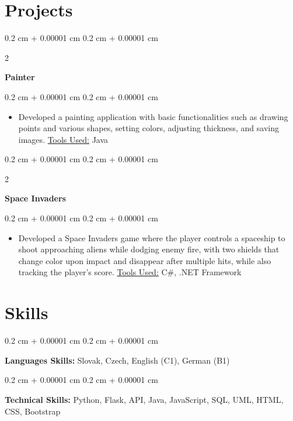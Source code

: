 \documentclass[10pt, letterpaper]{extarticle}
\newenvironment{highlights}{
    \begin{itemize}[
        topsep=0.10 cm,
        parsep=0.10 cm,
        partopsep=0pt,
        itemsep=0pt,
        leftmargin=0.4 cm + 10pt
    ]
}{
    \end{itemize}
} %
\newenvironment{onecolentry}{
    \begin{adjustwidth}{
        0.2 cm + 0.00001 cm
    }{
        0.2 cm + 0.00001 cm
    }
}{
    \end{adjustwidth}
} %
\newenvironment{twocolentry}[2][]{
    \onecolentry
    \def\secondColumn{#2}
    \setcolumnwidth{\fill, 4.5 cm}
    \begin{paracol}{2}
}{
    \switchcolumn \raggedleft \secondColumn
    \end{paracol}
    \endonecolentry
} %
\let\hrefWithoutArrow\href
\renewcommand{\href}[2]{\hrefWithoutArrow{#1}{\ifthenelse{\equal{#2}{}}{ }{#2 }\raisebox{.15ex}{\footnotesize \faExternalLink*}}}
\begin{document}
    \section{Projects}

        \begin{twocolentry}{
        \textit{\href{https://github.com/sabinasagova/painter}{\footnotesize\faGithub}}}
            \textbf{Painter}
        \end{twocolentry}

        \vspace{0.10 cm}
        \begin{onecolentry}
            \begin{highlights}
                \item Developed a painting application with basic functionalities such as drawing points and various shapes, setting colors, adjusting thickness, and saving images. \underline{Tools Used:} Java
            \end{highlights}
        \end{onecolentry}

        \vspace{0.2 cm}
        \begin{twocolentry}{
        \textit{\href{https://github.com/sabinasagova/space-invaders}{\footnotesize\faGithub}}}
            \textbf{Space Invaders}
        \end{twocolentry}

        \vspace{0.10 cm}
        \begin{onecolentry}
            \begin{highlights}
                 \item Developed a Space Invaders game where the player controls a spaceship to shoot approaching aliens while dodging enemy fire, with two shields that change color upon impact and disappear after multiple hits, while also tracking the player's score. \underline{Tools Used:} C\#, .NET Framework
            \end{highlights}
        \end{onecolentry}

    \section{Skills}

          
    \begin{onecolentry}
        \textbf{Languages Skills:} Slovak, Czech, English (C1), German (B1)
    \end{onecolentry}

    \vspace{0.1 cm}

    \begin{onecolentry}
        \textbf{Technical Skills:} Python, Flask, API, Java, JavaScript, SQL, UML, HTML, CSS, Bootstrap
    \end{onecolentry}
\end{document}
